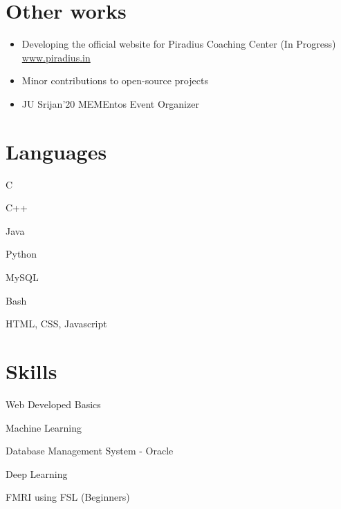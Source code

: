 \documentclass[]{deedy-resume-openfont}
\begin{document}
\begin{minipage}[t]{0.55\textwidth}
\section{Other works} 
\begin{itemize}
\item Developing the official website for Piradius Coaching Center (In Progress)
\\\href{https:\\www.piradius.in}{www.piradius.in}
\item Minor contributions to open-source projects
\item JU Srijan'20 MEMEntos Event Organizer
\end{itemize}


\end{minipage} 
\hfill
\begin{minipage}[t]{0.4\textwidth} 

\section{Languages} 
\hspace{0.5em}
\begin{tightemize}
\item C
\item C++
\item Java
\item Python
\end{tightemize}
\sectionsep
{}
\begin{tightemize}
\item MySQL
\item Bash
\item HTML, CSS, Javascript
\end{tightemize}
\sectionsep

\section{Skills} 
\sectionsep
\begin{tightemize}
\item Web Developed Basics
\item Machine Learning
\item Database Management System - Oracle
\item Deep Learning
\item FMRI using FSL (Beginners)
\end{tightemize}
\sectionsep


\end{minipage}
\end{document}
